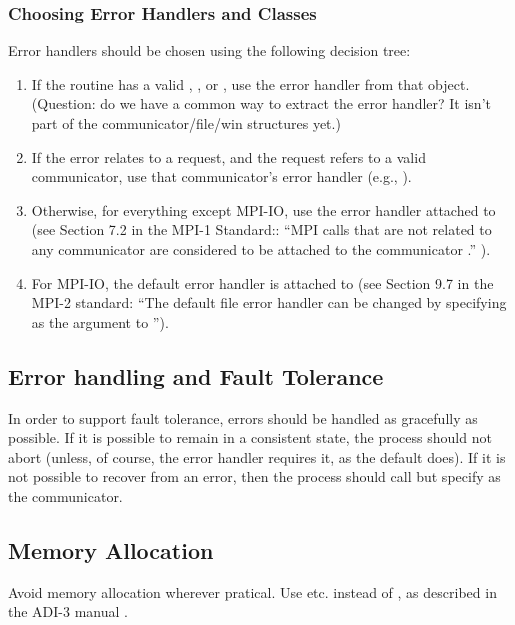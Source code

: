 \documentclass{article}
\begin{document}
\subsubsection{Choosing Error Handlers and Classes}
Error handlers should be chosen using the following decision tree:
\begin{enumerate}
\item If the routine has a valid , , or
  , use the error handler from that object.  (Question: do we
  have a common way to extract the error handler?  It isn't part of the
  communicator/file/win structures yet.)
\item If the error relates to a request, and the request refers to a valid
  communicator, use that communicator's error handler (e.g., ).
\item Otherwise, for everything except MPI-IO, use the error handler attached
  to   
  (see Section 7.2 in the MPI-1 Standard:: ``MPI calls that are not related to
  any communicator are considered to be attached to the communicator
  .'' ).
\item For MPI-IO, the default error handler is attached to
   (see Section 9.7 in the MPI-2 standard: ``The default
  file error handler can be changed by specifying  as the
   argument to ''). 
\end{enumerate}

\subsection{Error handling and Fault Tolerance}
In order to support fault tolerance, errors should be handled as
gracefully as possible.  If it is possible to remain in a consistent
state, the process should not abort (unless, of course, the error
handler requires it, as the default  does).  
If it is not possible to recover from an error, then the process
should call  but specify  as the
communicator.  

\subsection{Memory Allocation}
Avoid memory allocation wherever pratical.  Use 
etc. instead of , as described in the ADI-3 manual
\cite{adi3man}. 
\end{document}
